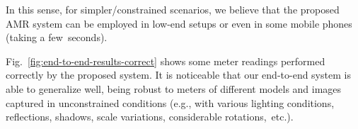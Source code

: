 In this sense, for simpler/constrained scenarios, we believe that the proposed AMR system can be employed in low-end setups or even in some mobile phones (taking a few~seconds).





Fig.~\ref{fig:end-to-end-results-correct} shows some meter readings performed correctly by the proposed system.
It is noticeable that our end-to-end system is able to generalize well, being robust to meters of different models and images captured in unconstrained conditions (e.g., with various lighting conditions, reflections, shadows, scale variations, considerable rotations,~etc.).

